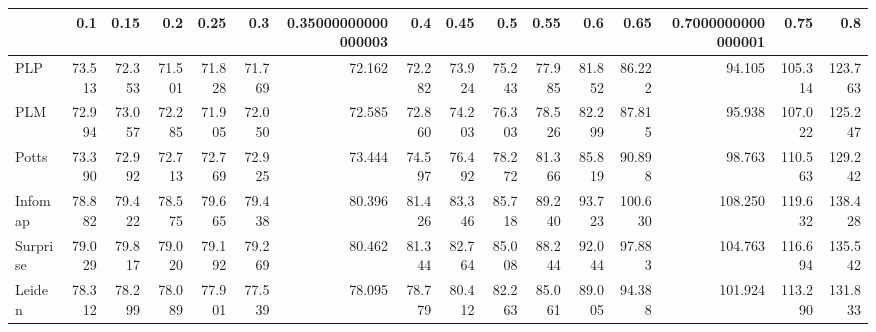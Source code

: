 \begin{tabular}{lrrrrrrrrrrrrrrr}
\toprule
{} &    0.1 &   0.15 &    0.2 &   0.25 &    0.3 & 0.35000000000000003 &    0.4 &   0.45 &    0.5 &   0.55 &    0.6 &    0.65 & 0.7000000000000001 &    0.75 &     0.8 \\
\midrule
PLP      & 73.513 & 72.353 & 71.501 & 71.828 & 71.769 &              72.162 & 72.282 & 73.924 & 75.243 & 77.985 & 81.852 &  86.222 &             94.105 & 105.314 & 123.763 \\
PLM      & 72.994 & 73.057 & 72.285 & 71.905 & 72.050 &              72.585 & 72.860 & 74.203 & 76.303 & 78.526 & 82.299 &  87.815 &             95.938 & 107.022 & 125.247 \\
Potts    & 73.390 & 72.992 & 72.713 & 72.769 & 72.925 &              73.444 & 74.597 & 76.492 & 78.272 & 81.366 & 85.819 &  90.898 &             98.763 & 110.563 & 129.242 \\
Infomap  & 78.882 & 79.422 & 78.575 & 79.665 & 79.438 &              80.396 & 81.426 & 83.346 & 85.718 & 89.240 & 93.723 & 100.630 &            108.250 & 119.632 & 138.428 \\
Surprise & 79.029 & 79.817 & 79.020 & 79.192 & 79.269 &              80.462 & 81.344 & 82.764 & 85.008 & 88.244 & 92.044 &  97.883 &            104.763 & 116.694 & 135.542 \\
Leiden   & 78.312 & 78.299 & 78.089 & 77.901 & 77.539 &              78.095 & 78.779 & 80.412 & 82.263 & 85.061 & 89.005 &  94.388 &            101.924 & 113.290 & 131.833 \\
\bottomrule
\end{tabular}
